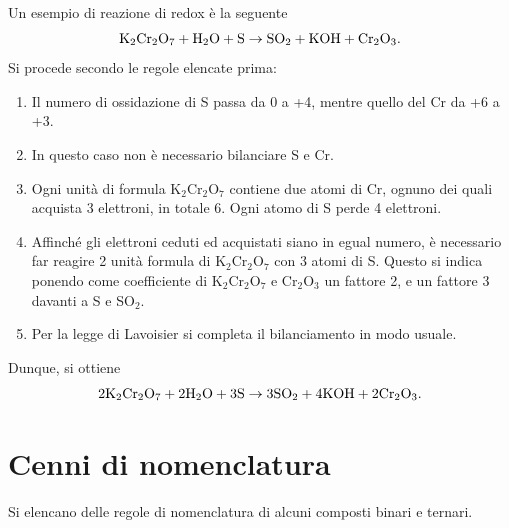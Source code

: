 \begin{ex}
    Un esempio di reazione di redox è la seguente
    \begin{equation}
        \textnormal{K}_2\textnormal{Cr}_2\textnormal{O}_7+\textnormal{H}_2\textnormal{O}+\textnormal{S}\to\textnormal{SO}_2+\textnormal{KOH}+\textnormal{Cr}_2\textnormal{O}_3.
    \end{equation}
    Si procede secondo le regole elencate prima:
    \begin{enumerate}
        \item Il numero di ossidazione di \textnormal{S} passa da 0 a +4, mentre quello del \textnormal{Cr} da +6 a +3.
        \item In questo caso non è necessario bilanciare \textnormal{S} e \textnormal{Cr}.
        \item Ogni unità di formula \textnormal{K}$_2$\textnormal{Cr}$_2$\textnormal{O}$_7$ contiene due atomi di \textnormal{Cr}, ognuno dei quali acquista 3 elettroni, in totale 6. Ogni atomo di \textnormal{S} perde 4 elettroni.
        \item Affinché gli elettroni ceduti ed acquistati siano in egual numero, è necessario far reagire 2 unità formula di \textnormal{K}$_2$\textnormal{Cr}$_2$\textnormal{O}$_7$ con 3 atomi di \textnormal{S}. Questo si indica ponendo come coefficiente di \textnormal{K}$_2$\textnormal{Cr}$_2$\textnormal{O}$_7$ e \textnormal{Cr}$_2$\textnormal{O}$_3$ un fattore 2, e un fattore 3 davanti a \textnormal{S} e \textnormal{SO}$_2$.
        \item Per la legge di Lavoisier si completa il bilanciamento in modo usuale.
    \end{enumerate}
    Dunque, si ottiene
    \begin{equation}
        2\textnormal{K}_2\textnormal{Cr}_2\textnormal{O}_7+2\textnormal{H}_2\textnormal{O}+3\textnormal{S}\to3\textnormal{SO}_2+4\textnormal{KOH}+2\textnormal{Cr}_2\textnormal{O}_3.
    \end{equation}
\end{ex}

\section{Cenni di nomenclatura}
Si elencano delle regole di nomenclatura di alcuni composti binari e ternari.
